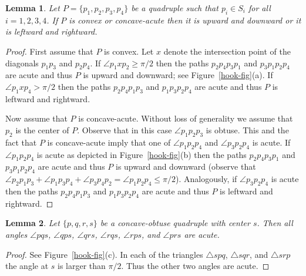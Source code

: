 \documentclass[11pt,letter]{article}
\newtheorem{lemma}{Lemma}
\begin{document}
\begin{lemma}
	\label{convex-acute-quadruple-lemma}
	Let $P=\{p_1,p_2,p_3,p_4\}$ be a quadruple such that $p_i\in S_i$ for all $i=1,2,3,4$. If $P$ is convex or concave-acute then it is upward and downward or it is leftward and rightward. 
\end{lemma}
\begin{proof}
	First assume that $P$ is convex. Let $x$ denote the intersection point of the diagonals $p_1p_3$ and $p_2p_4$. If $\angle p_1xp_2 \geqslant \pi/2$ then the paths $p_2p_4p_3p_1$ and $p_3p_1p_2p_4$ are acute and thus $P$ is upward and downward; see Figure~\ref{hook-fig}(a). If $\angle p_1xp_4 > \pi/2$ then the paths $p_2p_4p_1p_3$ and $p_1p_3p_2p_4$ are acute and thus $P$ is leftward and rightward.
	
	Now assume that $P$ is concave-acute. Without loss of generality we assume that $p_2$ is the center of $P$. Observe that in this case $\angle p_1p_2p_3$ is obtuse. This and the fact that $P$ is concave-acute imply that one of $\angle p_1p_2p_4$ and $\angle p_3p_2p_4$ is acute. If $\angle p_1p_2p_4$ is acute as depicted in Figure~\ref{hook-fig}(b) then the paths $p_2p_4p_3p_1$ and $p_3p_1p_2p_4$ are acute and thus $P$ is upward and downward (observe that $\angle p_2p_1p_3 + \angle p_1p_3p_4 + \angle p_3p_4p_2 = \angle p_1p_2p_4 \leqslant \pi/2$). Analogously, if $\angle p_3p_2p_4$ is acute then the paths $p_2p_4p_1p_3$ and $p_1p_3p_2p_4$ are acute and thus $P$ is leftward and rightward.
\end{proof}


\begin{lemma}
	\label{obtuse-quadruple-lemma}
	Let $\{p,q,r,s\}$ be a concave-obtuse quadruple with center $s$. Then all angles $\angle pqs$, $\angle qps$, $\angle qrs$, $\angle rqs$, $\angle rps$, and $\angle prs$ are acute.
\end{lemma}
\begin{proof}
	See Figure~\ref{hook-fig}(c). In each of the triangles $\bigtriangleup spq$, $\bigtriangleup sqr$, and $\bigtriangleup srp$ the angle at $s$ is larger than $\pi/2$. Thus the other two angles are acute.
\end{proof}
\end{document}
